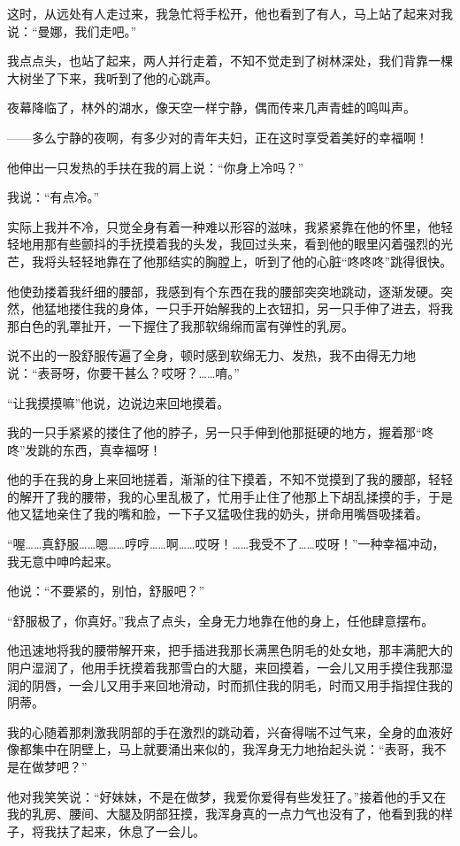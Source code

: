 \documentclass[12pt,UTF8]{ctexbook}
\begin{document}
这时，从远处有人走过来，我急忙将手松开，他也看到了有人，马上站了起来对我说：“曼娜，我们走吧。”

我点点头，也站了起来，两人并行走着，不知不觉走到了树林深处，我们背靠一棵大树坐了下来，我听到了他的心跳声。

夜幕降临了，林外的湖水，像天空一样宁静，偶而传来几声青蛙的鸣叫声。

——多么宁静的夜啊，有多少对的青年夫妇，正在这时享受着美好的幸福啊！

他伸出一只发热的手扶在我的肩上说：“你身上冷吗？”

我说：“有点冷。”

实际上我并不冷，只觉全身有着一种难以形容的滋味，我紧紧靠在他的怀里，他轻轻地用那有些颤抖的手抚摸着我的头发，我回过头来，看到他的眼里闪着强烈的光芒，我将头轻轻地靠在了他那结实的胸膛上，听到了他的心脏“咚咚咚”跳得很快。

他使劲搂着我纤细的腰部，我感到有个东西在我的腰部突突地跳动，逐渐发硬。突然，他猛地搂住我的身体，一只手开始解我的上衣钮扣，另一只手伸了进去，将我那白色的乳罩扯开，一下握住了我那软绵绵而富有弹性的乳房。

说不出的一股舒服传遍了全身，顿时感到软绵无力、发热，我不由得无力地说：“表哥呀，你要干甚么？哎呀？……唷。”

“让我摸摸嘛”他说，边说边来回地摸着。

我的一只手紧紧的搂住了他的脖子，另一只手伸到他那挺硬的地方，握着那“咚咚”发跳的东西，真幸福呀！

他的手在我的身上来回地搓着，渐渐的往下摸着，不知不觉摸到了我的腰部，轻轻的解开了我的腰带，我的心里乱极了，忙用手止住了他那上下胡乱揉摸的手，于是他又猛地亲住了我的嘴和脸，一下子又猛吸住我的奶头，拼命用嘴唇吸揉着。

“喔……真舒服……嗯……哼哼……啊……哎呀！……我受不了……哎呀！”一种幸福冲动，我无意中呻吟起来。

他说：“不要紧的，别怕，舒服吧？”

“舒服极了，你真好。”我点了点头，全身无力地靠在他的身上，任他肆意摆布。

他迅速地将我的腰带解开来，把手插进我那长满黑色阴毛的处女地，那丰满肥大的阴户湿润了，他用手抚摸着我那雪白的大腿，来回摸着，一会儿又用手摸住我那湿润的阴唇，一会儿又用手来回地滑动，时而抓住我的阴毛，时而又用手指捏住我的阴蒂。

我的心随着那刺激我阴部的手在激烈的跳动着，兴奋得喘不过气来，全身的血液好像都集中在阴壁上，马上就要涌出来似的，我浑身无力地抬起头说：“表哥，我不是在做梦吧？”

他对我笑笑说：“好妹妹，不是在做梦，我爱你爱得有些发狂了。”接着他的手又在我的乳房、腰间、大腿及阴部狂摸，我浑身真的一点力气也没有了，他看到我的样子，将我扶了起来，休息了一会儿。
\end{document}
